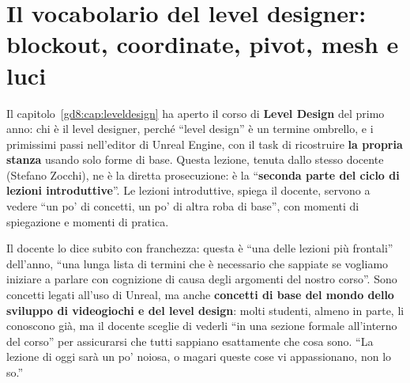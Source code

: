 
\chapter[Blockout, coordinate e luci]{Il vocabolario del level designer:
blockout, coordinate, pivot, mesh e luci}
\label{gd11:cap:blockout-luci}

Il capitolo~\ref{gd8:cap:leveldesign} ha aperto il corso di \textbf{Level
Design} del primo anno: chi è il level designer, perché ``level design'' è un
termine ombrello, e i primissimi passi nell'editor di Unreal Engine, con il
task di ricostruire \textbf{la propria stanza} usando solo forme di base. Questa
lezione, tenuta dallo stesso docente (Stefano Zocchi), ne è la diretta
prosecuzione: è la ``\textbf{seconda parte del ciclo di lezioni
introduttive}''. Le lezioni introduttive, spiega il docente, servono a vedere
``un po' di concetti, un po' di altra roba di base'', con momenti di
spiegazione e momenti di pratica.

Il docente lo dice subito con franchezza: questa è ``una delle lezioni più
frontali'' dell'anno, ``una lunga lista di termini che è necessario che
sappiate se vogliamo iniziare a parlare con cognizione di causa degli
argomenti del nostro corso''. Sono concetti legati all'uso di Unreal, ma anche
\textbf{concetti di base del mondo dello sviluppo di videogiochi e del level
design}: molti studenti, almeno in parte, li conoscono già, ma il docente
sceglie di vederli ``in una sezione formale all'interno del corso'' per
assicurarsi che tutti sappiano esattamente che cosa sono. ``La lezione di oggi
sarà un po' noiosa, o magari queste cose vi appassionano, non lo so.''

